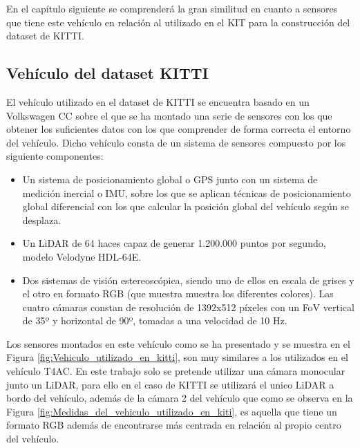 En el capítulo siguiente se comprenderá la gran similitud en cuanto a sensores que tiene este vehículo en relación al utilizado en el \ac{KIT} para la construcción del dataset de KITTI.

\subsection{Vehículo del dataset KITTI}
\label{sec:Vehículo del dataset KITTI}

El vehículo utilizado en el dataset de KITTI se encuentra basado en un Volkswagen CC sobre el que se ha montado una serie de sensores con los que obtener los suficientes datos con los que comprender de forma correcta el entorno del vehículo. Dicho vehículo consta de un sistema de sensores compuesto por los siguiente componentes:

\begin{itemize}
    \item Un sistema de posicionamiento global o \acs{GPS} junto con un sistema de medición inercial o \acs{IMU}, sobre los que se aplican técnicas de posicionamiento global diferencial con los que calcular la posición global del vehículo según se desplaza.
    \item Un \ac{LiDAR} de 64 haces capaz de generar 1.200.000 puntos por segundo, modelo Velodyne HDL-64E.
    \item Dos sistemas de visión estereoscópica, siendo uno de ellos en escala de grises y el otro en formato RGB (que muestra muestra los diferentes colores). Las cuatro cámaras constan de resolución de 1392x512 píxeles con un \ac{FoV} vertical de 35º y horizontal de 90º, tomadas a una velocidad de 10 Hz.
\end{itemize}

Los sensores montados en este vehículo como se ha presentado y se muestra en el Figura \ref{fig:Vehiculo_utilizado_en_kitti}, son muy similares a los utilizados en el vehículo T4AC. En este trabajo solo se pretende utilizar una cámara monocular junto un \ac{LiDAR}, para ello en el caso de KITTI se utilizará el unico \ac{LiDAR} a bordo del vehículo, además de la cámara 2 del vehículo que como se observa en la Figura \ref{fig:Medidas_del_vehiculo_utilizado_en_kiti}, es aquella que tiene un formato RGB además de encontrarse más centrada en relación al propio centro del vehículo.

